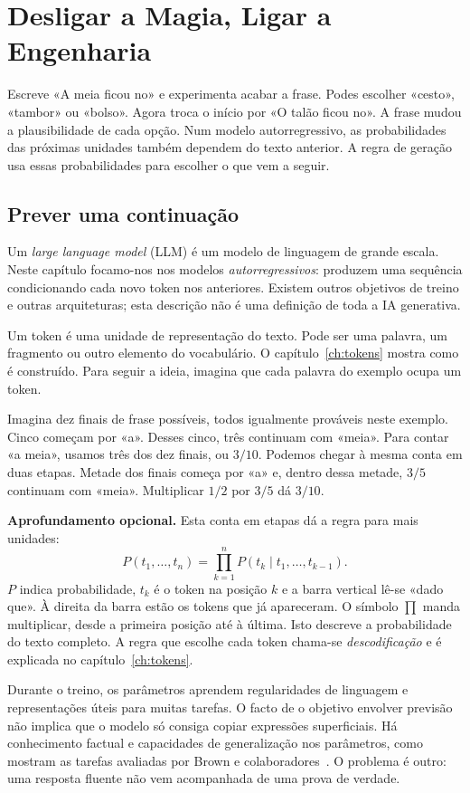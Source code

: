 \chapter{Desligar a Magia, Ligar a Engenharia}
\label{ch:fundamentos}

Escreve «A meia ficou no» e experimenta acabar a frase. Podes escolher «cesto», «tambor» ou «bolso». Agora troca o início por «O talão ficou no». A frase mudou a plausibilidade de cada opção. Num modelo autorregressivo, as probabilidades das próximas unidades também dependem do texto anterior. A regra de geração usa essas probabilidades para escolher o que vem a seguir.

\section{Prever uma continuação}
Um \emph{large language model} (LLM) é um modelo de linguagem de grande escala. Neste capítulo focamo-nos nos modelos \emph{autorregressivos}: produzem uma sequência condicionando cada novo token nos anteriores. Existem outros objetivos de treino e outras arquiteturas; esta descrição não é uma definição de toda a IA generativa.

Um token é uma unidade de representação do texto. Pode ser uma palavra, um fragmento ou outro elemento do vocabulário. O capítulo~\ref{ch:tokens} mostra como é construído. Para seguir a ideia, imagina que cada palavra do exemplo ocupa um token.

Imagina dez finais de frase possíveis, todos igualmente prováveis neste exemplo. Cinco começam por «a». Desses cinco, três continuam com «meia». Para contar «a meia», usamos três dos dez finais, ou $3/10$. Podemos chegar à mesma conta em duas etapas. Metade dos finais começa por «a» e, dentro dessa metade, $3/5$ continuam com «meia». Multiplicar $1/2$ por $3/5$ dá $3/10$.

\textbf{Aprofundamento opcional.} Esta conta em etapas dá a regra para mais unidades:
\[
P(t_1,\ldots,t_n)=\prod_{k=1}^{n}P(t_k\mid t_1,\ldots,t_{k-1}).
\]
$P$ indica probabilidade, $t_k$ é o token na posição $k$ e a barra vertical lê-se «dado que». À direita da barra estão os tokens que já apareceram. O símbolo $\prod$ manda multiplicar, desde a primeira posição até à última. Isto descreve a probabilidade do texto completo. A regra que escolhe cada token chama-se \emph{descodificação} e é explicada no capítulo~\ref{ch:tokens}.

Durante o treino, os parâmetros aprendem regularidades de linguagem e representações úteis para muitas tarefas. O facto de o objetivo envolver previsão não implica que o modelo só consiga copiar expressões superficiais. Há conhecimento factual e capacidades de generalização nos parâmetros, como mostram as tarefas avaliadas por Brown e colaboradores~\citep{brown2020}. O problema é outro: uma resposta fluente não vem acompanhada de uma prova de verdade.

